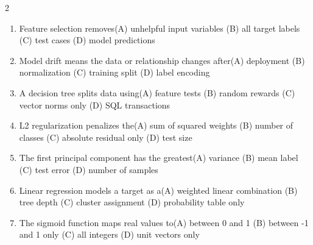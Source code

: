 \documentclass[a4paper]{article}
\begin{document}
\begin{multicols*}{2}
\begin{enumerate}[resume]
\item Feature selection removes\newline\hspace*{0.6em}(A) unhelpful input variables \quad (B) all target labels \newline\hspace*{0.6em}(C) test cases \quad (D) model predictions
\item Model drift means the data or relationship changes after\newline\hspace*{0.6em}(A) deployment \quad (B) normalization \newline\hspace*{0.6em}(C) training split \quad (D) label encoding
\item A decision tree splits data using\newline\hspace*{0.6em}(A) feature tests \quad (B) random rewards \newline\hspace*{0.6em}(C) vector norms only \quad (D) SQL transactions
\item L2 regularization penalizes the\newline\hspace*{0.6em}(A) sum of squared weights \quad (B) number of classes \newline\hspace*{0.6em}(C) absolute residual only \quad (D) test size
\item The first principal component has the greatest\newline\hspace*{0.6em}(A) variance \quad (B) mean label \newline\hspace*{0.6em}(C) test error \quad (D) number of samples
\item Linear regression models a target as a\newline\hspace*{0.6em}(A) weighted linear combination \quad (B) tree depth \newline\hspace*{0.6em}(C) cluster assignment \quad (D) probability table only
\item The sigmoid function maps real values to\newline\hspace*{0.6em}(A) between 0 and 1 \quad (B) between -1 and 1 only \newline\hspace*{0.6em}(C) all integers \quad (D) unit vectors only

\end{enumerate}
\end{multicols*}
\end{document}
